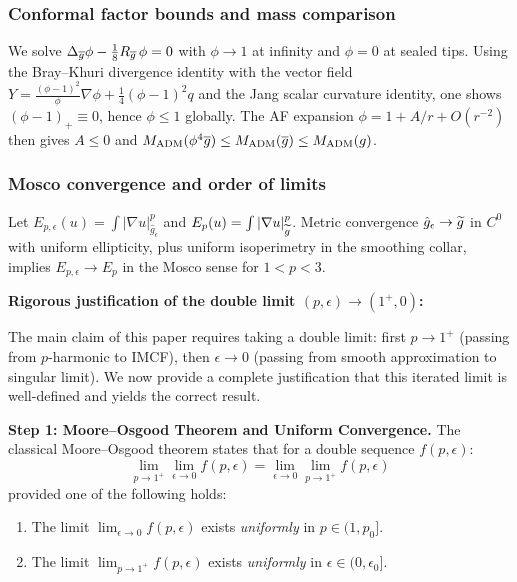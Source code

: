 \subsubsection{Conformal factor bounds and mass comparison}
We solve $\Delta_{\overline{g}}\phi-\tfrac18R_{\overline{g}}\,\phi=0$ with $\phi\to 1$ at infinity and $\phi=0$ at sealed tips. Using the Bray--Khuri divergence identity with the vector field $Y=\frac{(\phi-1)^2}{\phi}\nabla\phi+\tfrac14(\phi-1)^2 q$ and the Jang scalar curvature identity, one shows $(\phi-1)_+\equiv 0$, hence $\phi\le 1$ globally. The AF expansion $\phi=1+A/r+O(r^{-2})$ then gives $A\le 0$ and $M_{\mathrm{ADM}}(\phi^4\overline{g})\le M_{\mathrm{ADM}}(\overline{g})\le M_{\mathrm{ADM}}(g)$.

\subsubsection{Mosco convergence and order of limits}\label{sec:DoubleLimit}
Let $E_{p,\epsilon}(u)=\int |\nabla u|_{\hat g_\epsilon}^p$ and $E_p(u)=\int |\nabla u|_{\widetilde{g}}^p$. Metric convergence $\hat g_\epsilon\to \widetilde{g}$ in $C^0$ with uniform ellipticity, plus uniform isoperimetry in the smoothing collar, implies $E_{p,\epsilon}\to E_p$ in the Mosco sense for $1<p<3$. 

\textbf{Rigorous justification of the double limit $(p, \epsilon) \to (1^+, 0)$:}

The main claim of this paper requires taking a double limit: first $p \to 1^+$ (passing from $p$-harmonic to IMCF), then $\epsilon \to 0$ (passing from smooth approximation to singular limit). We now provide a complete justification that this iterated limit is well-defined and yields the correct result.

\textbf{Step 1: Moore--Osgood Theorem and Uniform Convergence.}
The classical Moore--Osgood theorem states that for a double sequence $f(p, \epsilon)$:
\begin{equation}
    \lim_{p \to 1^+} \lim_{\epsilon \to 0} f(p, \epsilon) = \lim_{\epsilon \to 0} \lim_{p \to 1^+} f(p, \epsilon)
\end{equation}
provided one of the following holds:
\begin{enumerate}
    \item[(i)] The limit $\lim_{\epsilon \to 0} f(p, \epsilon)$ exists \emph{uniformly} in $p \in (1, p_0]$.
    \item[(ii)] The limit $\lim_{p \to 1^+} f(p, \epsilon)$ exists \emph{uniformly} in $\epsilon \in (0, \epsilon_0]$.
\end{enumerate}

